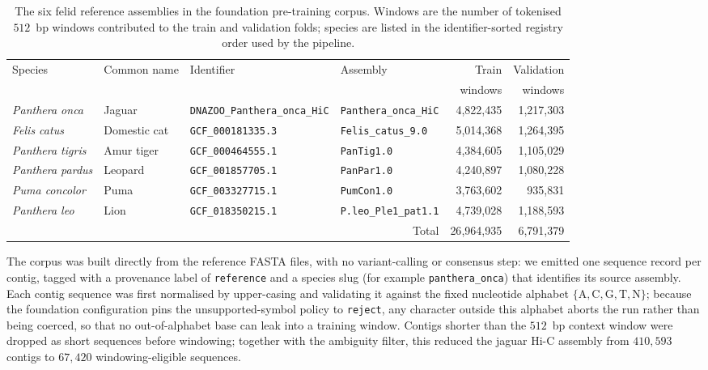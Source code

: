 \documentclass[twocolumn,10pt]{article}
\begin{document}
\begin{table}[t]
\centering
\caption{The six felid reference assemblies in the foundation pre-training corpus. Windows are the
number of tokenised $512$~bp windows contributed to the train and validation folds; species are
listed in the identifier-sorted registry order used by the pipeline.}
\label{tab:felid-corpus}
\begin{tabular}{llllrr}
\toprule
Species & Common name & Identifier & Assembly & Train & Validation \\
& & & & windows & windows \\
\midrule
\textit{Panthera onca}
  & Jaguar
  & \texttt{DNAZOO\_Panthera\_onca\_HiC}
  & \texttt{Panthera\_onca\_HiC}
  & 4{,}822{,}435
  & 1{,}217{,}303 \\
\textit{Felis catus}
  & Domestic cat
  & \texttt{GCF\_000181335.3}
  & \texttt{Felis\_catus\_9.0}
  & 5{,}014{,}368
  & 1{,}264{,}395 \\
\textit{Panthera tigris}
  & Amur tiger
  & \texttt{GCF\_000464555.1}
  & \texttt{PanTig1.0}
  & 4{,}384{,}605
  & 1{,}105{,}029 \\
\textit{Panthera pardus}
  & Leopard
  & \texttt{GCF\_001857705.1}
  & \texttt{PanPar1.0}
  & 4{,}240{,}897
  & 1{,}080{,}228 \\
\textit{Puma concolor}
  & Puma
  & \texttt{GCF\_003327715.1}
  & \texttt{PumCon1.0}
  & 3{,}763{,}602
  & 935{,}831 \\
\textit{Panthera leo}
  & Lion
  & \texttt{GCF\_018350215.1}
  & \texttt{P.leo\_Ple1\_pat1.1}
  & 4{,}739{,}028
  & 1{,}188{,}593 \\
\midrule
\multicolumn{4}{r}{Total} & 26{,}964{,}935 & 6{,}791{,}379 \\
\bottomrule
\end{tabular}
\end{table}

The corpus was built directly from the reference FASTA files, with no variant-calling or consensus
step: we emitted one sequence record per contig, tagged with a provenance label of
\texttt{reference} and a species slug (for example \texttt{panthera\_onca}) that identifies its
source assembly. Each contig sequence was first normalised by upper-casing and validating it against
the fixed nucleotide alphabet $\{\mathrm{A},\mathrm{C},\mathrm{G},\mathrm{T},\mathrm{N}\}$; because
the foundation configuration pins the unsupported-symbol policy to \texttt{reject}, any character
outside this alphabet aborts the run rather than being coerced, so that no out-of-alphabet base can
leak into a training window. Contigs shorter than the $512$~bp context window were dropped as short
sequences before windowing; together with the ambiguity filter, this reduced the jaguar Hi-C
assembly from $410{,}593$ contigs to $67{,}420$ windowing-eligible sequences.
\end{document}
